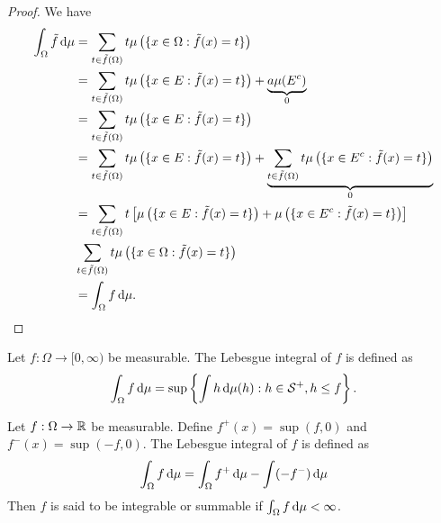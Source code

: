 \begin{proof}
 We have
 \begin{align*}
  \int_\Omega \tilde{f} \,\mathrm{d} \mu
   & = \sum\limits_{t\in \tilde{f}(\Omega)} t\mu\left(\{x\in \Omega : \tilde{f}(x) = t\}\right)                                                                                                \\
   & = \sum\limits_{t\in \tilde{f}(\Omega)} t\mu\left(\{x\in E : \tilde{f}(x) = t\}\right) + \underbrace{a\mu(E^c)}_{0}                                                                        \\
   & = \sum\limits_{t\in \tilde{f}(\Omega)} t\mu\left(\{x\in E : \tilde{f}(x) = t\}\right)                                                                                                     \\
   & = \sum\limits_{t\in \tilde{f}(\Omega)} t\mu\left(\{x\in E : \tilde{f}(x) = t\}\right) + \underbrace{\sum\limits_{t\in \tilde{f}(\Omega)} t\mu\left(\{x\in E^c : \tilde{f}(x) = t\}\right)
  }_{0}                                                                                                                                                                                        \\
   & = \sum\limits_{t\in \tilde{f}(\Omega)} t\left[\mu\left(\{x\in E : \tilde{f}(x) = t\}\right) + \mu\left(\{x\in E^c : \tilde{f}(x) = t\}\right)\right]                                      \\
   & \sum\limits_{t\in \tilde{f}(\Omega)} t\mu\left(\{x\in \Omega : \tilde{f}(x) = t\}\right)                                                                                                  \\
   & = \int_\Omega f \,\mathrm{d} \mu.
 \end{align*}
\end{proof}

\begin{definition}
 Let $f:\Omega\to[0,\infty)$ be measurable. The Lebesgue integral of $f$ is defined as
 \begin{equation}
  \int_\Omega f\,\mathrm{d} \mu = \sup\left\{\int\limits h\,\mathrm{d} \mu(h) : h\in\mathcal{S}^+, h\le f\right\}.
 \end{equation}
\end{definition}

\begin{definition}
 Let $f:\Omega\to\mathbb{R}$ be measurable. Define $f^+(x) = \sup(f,0)$ and $f^-(x) = \sup(-f,0)$. The Lebesgue integral of $f$ is defined as
 \begin{equation}
  \int_\Omega f\,\mathrm{d} \mu = \int_\Omega f^+\,\mathrm{d} \mu - \int(-f^-)\,\mathrm{d} \mu
 \end{equation}
 Then $f$ is said to be integrable or summable if $\int_\Omega f\,\mathrm{d} \mu<\infty$.
\end{definition}

